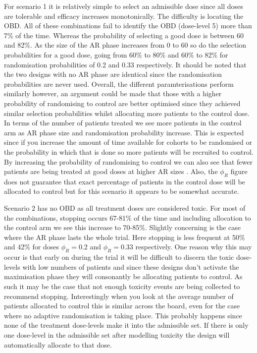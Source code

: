 \newpage

For scenario 1 it is relatively simple to select an admissible dose since all doses are tolerable and efficacy increases monotonically. The difficulty is locating the OBD. All of these combinations fail to identify the OBD (dose-level 5) more than 7\% of the time. Whereas the probability of selecting a good dose is between 60 and 82\%. As the size of the AR phase increases from 0 to 60 so do the selection probabilities for a good dose, going from 60\% to 80\% and 60\% to 82\% for randomisation probabilities of 0.2 and 0.33 respectively. It should be noted that the two designs with no AR phase are identical since the randomisation probabilities are never used. Overall, the different paramterisations perform similarly however, an argument could be made that those with a higher probability of randomising to control are better optimised since they achieved similar selection probabilities whilst allocating more patients to the control dose. In terms of the number of patients treated we see more patients in the control arm as AR phase size and randomisation probability increase. This is expected since if you increase the amount of time available for cohorts to be randomised or the probability in which that is done so more patients will be recruited to control. By increasing the probability of randomising to control we can also see that fewer patients are being treated at good doses at higher AR sizes . Also, the $\phi_R$ figure does not guarantee that exact percentage of patients in the control dose will be allocated to control but for this scenario it appears to be somewhat accurate. 

Scenario 2 has no OBD as all treatment doses are considered toxic. For most of the combinations, stopping occurs 67-81\% of the time and including allocation to the control arm we see this increase to 70-85\%. Slightly concerning is the case where the AR phase lasts the whole trial. Here stopping is less frequent at 50\% and 42\% for doses $\phi_R = 0.2$ and $\phi_R = 0.33$ respectively. One reason why this may occur is that early on during the trial it will be difficult to discern the toxic dose-levels with low numbers of patients and since these designs don't activate the maximisation phase they will consonantly be allocating patients to control. As such it may be the case that not enough toxicity events are being collected to recommend stopping. Interestingly when you look at the average number of patients allocated to control this is similar across the board, even for the case where no adaptive randomisation is taking place. This probably happens since none of the treatment dose-levels make it into the admissible set. If there is only one dose-level in the admissible set after modelling toxicity the design will automatically allocate to that dose.  

